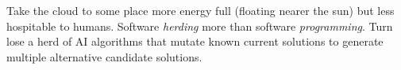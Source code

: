 \documentclass[journal]{IEEEtran}
\begin{document}
\begin{itemize}
{Take the cloud to some place more energy full (floating nearer the sun) but less hospitable to humans. Software {\em herding} more
than software {\em programming}. Turn lose a herd of AI algorithms
that mutate known current solutions to generate multiple
alternative candidate solutions.


%
%



%
%


}
\end{itemize}
\end{document}
